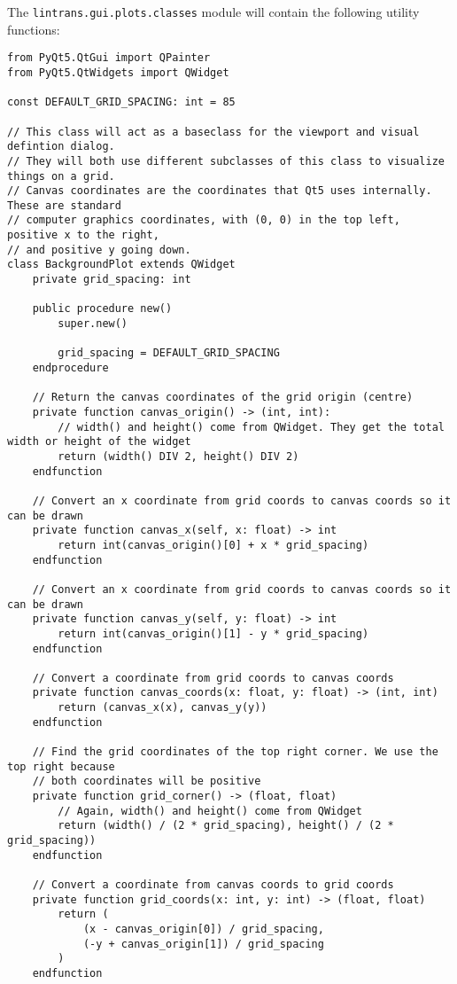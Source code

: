 \documentclass[../main.tex]{subfiles}
\begin{document}
The \texttt{lintrans.gui.plots.classes} module will contain the following utility functions:

\begin{verbatim}
from PyQt5.QtGui import QPainter
from PyQt5.QtWidgets import QWidget

const DEFAULT_GRID_SPACING: int = 85

// This class will act as a baseclass for the viewport and visual defintion dialog.
// They will both use different subclasses of this class to visualize things on a grid.
// Canvas coordinates are the coordinates that Qt5 uses internally. These are standard
// computer graphics coordinates, with (0, 0) in the top left, positive x to the right,
// and positive y going down.
class BackgroundPlot extends QWidget
	private grid_spacing: int

	public procedure new()
		super.new()

		grid_spacing = DEFAULT_GRID_SPACING
	endprocedure

	// Return the canvas coordinates of the grid origin (centre)
	private function canvas_origin() -> (int, int):
		// width() and height() come from QWidget. They get the total width or height of the widget
		return (width() DIV 2, height() DIV 2)
	endfunction

	// Convert an x coordinate from grid coords to canvas coords so it can be drawn
	private function canvas_x(self, x: float) -> int
		return int(canvas_origin()[0] + x * grid_spacing)
	endfunction

	// Convert an x coordinate from grid coords to canvas coords so it can be drawn
	private function canvas_y(self, y: float) -> int
		return int(canvas_origin()[1] - y * grid_spacing)
	endfunction

	// Convert a coordinate from grid coords to canvas coords
	private function canvas_coords(x: float, y: float) -> (int, int)
		return (canvas_x(x), canvas_y(y))
	endfunction

	// Find the grid coordinates of the top right corner. We use the top right because
	// both coordinates will be positive
	private function grid_corner() -> (float, float)
		// Again, width() and height() come from QWidget
		return (width() / (2 * grid_spacing), height() / (2 * grid_spacing))
	endfunction

	// Convert a coordinate from canvas coords to grid coords
	private function grid_coords(x: int, y: int) -> (float, float)
		return (
			(x - canvas_origin[0]) / grid_spacing,
			(-y + canvas_origin[1]) / grid_spacing
		)
	endfunction


\end{verbatim}
\end{document}
